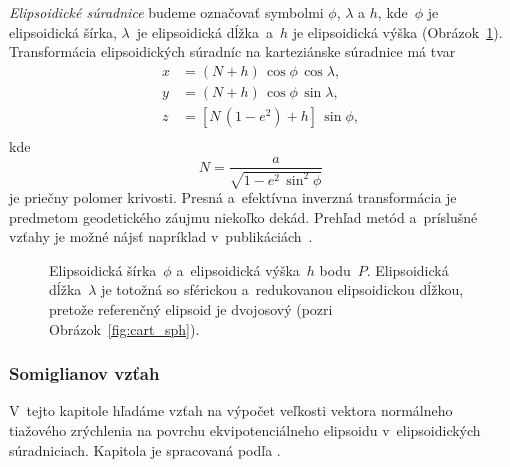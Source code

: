 \documentclass[a4paper, 12pt]{book}
\begin{document}
\emph{Elipsoidické súradnice} budeme označovať symbolmi $\phi$, $\lambda$ 
a $h$, kde~$\phi$ je elipsoidická šírka, $\lambda$~je elipsoidická dĺžka~a~$h$ 
je elipsoidická výška (Obrázok~\ref{fig:ell_coords}).  Transformácia 
elipsoidických súradníc na karteziánske súradnice má tvar 
\parencite{MoritzPhysicalGeodesy}
%
\begin{equation}
\begin{split}
x &= (N + h) \, \cos\phi \, \cos\lambda{,}\\
y &= (N + h) \, \cos\phi \, \sin\lambda{,}\\
z &= \left[ N \, (1 - e^2) + h \right] \, \sin\phi{,}\\
\end{split}
\end{equation}
%
kde
%
\begin{equation}
N = \frac{a}{\sqrt{1 - e^2 \, \sin^2\phi}}
\end{equation}
%
je priečny polomer krivosti.  Presná a~efektívna inverzná transformácia je 
predmetom geodetického záujmu niekoľko dekád.  Prehľad metód a~príslušné vzťahy 
je možné nájsť napríklad v~publikáciách~\textcite{Fukushima2006,Claessens2019}.

\begin{figure}[bt]
\centering

\caption{Elipsoidická šírka~$\phi$ a~elipsoidická výška~$h$ bodu~$P$.  
Elipsoidická dĺžka~$\lambda$ je totožná so sférickou a~redukovanou 
elipsoidickou dĺžkou, pretože referenčný elipsoid je dvojosový (pozri 
Obrázok~\ref{fig:cart_sph}).}
\label{fig:ell_coords}
\end{figure}

\subsubsection{Somiglianov vzťah}
\label{sec:somigliana}

V~tejto kapitole hľadáme vzťah na výpočet veľkosti vektora normálneho tiažového 
zrýchlenia na povrchu ekvipotenciálneho elipsoidu v~elipsoidických 
súradniciach.  Kapitola je spracovaná podľa \textcite{MoritzPhysicalGeodesy}.
\end{document}
